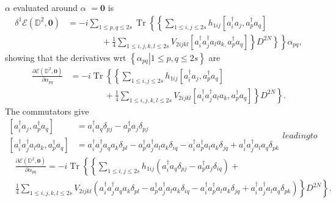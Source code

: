 \documentclass[aps,preprint]{revtex4}%
\begin{document}
\textbf{$\alpha$} evaluated around \textbf{$\alpha$ }$=\mathbf{0}$ is
\begin{align}
\delta^{1}\mathcal{E}\left(  \mathbb{D}^{2},\mathbf{0}\right)   &
=-i\sum_{1\leq p,q\leq2s}\operatorname{Tr}\left\{  \left\{  \sum_{1\leq
i,j\leq2s}h_{1ij}\left[  a_{i}^{\dagger}a_{j},a_{p}^{\dagger}a_{q}\right]
\right.  \right. \nonumber\\
&  \qquad\qquad+\left.  \left.  \frac{1}{4}\sum_{1\leq i,j,k,l\leq2s}%
V_{2ijkl}\left[  a_{i}^{\dagger}a_{j}^{\dagger}a_{l}a_{k,}a_{p}^{\dagger}%
a_{q}\right]  \right\}  \left.  D^{2N}\right\}  \right\}  \alpha_{pq},
\end{align}
showing that the derivatives wrt $\left\{  \left.  \alpha_{pq}\right\vert
1\leq p,q\leq2s\right\}  $ are
\begin{align}
\frac{\partial\mathcal{E}\left(  \mathbb{D}^{2},\mathbf{0}\right)  }%
{\partial\alpha_{pq}}  &  =-i\operatorname{Tr}\left\{  \left\{  \sum_{1\leq
i,j\leq2s}h_{1ij}\left[  a_{i}^{\dagger}a_{j},a_{p}^{\dagger}a_{q}\right]
\right.  \right. \nonumber\\
&  \qquad\qquad+\left.  \left.  \frac{1}{4}\sum_{1\leq i,j,k,l\leq2s}%
V_{2ijkl}\left[  a_{i}^{\dagger}a_{j}^{\dagger}a_{l}a_{k},a_{p}^{\dagger}%
a_{q}\right]  \right\}  D^{2N}\right\}  .
\end{align}
The commutators give
\begin{subequations}
\begin{align}
\left[  a_{i}^{\dagger}a_{j},a_{p}^{\dagger}a_{q}\right]   &  =a_{i}^{\dagger
}a_{q}\delta_{pj}-a_{p}^{\dagger}a_{j}\delta_{pj}\\
\left[  a_{i}^{\dagger}a_{j}^{\dagger}a_{l}a_{k},a_{p}^{\dagger}a_{q}\right]
&  =a_{i}^{\dagger}a_{j}^{\dagger}a_{q}a_{k}\delta_{pl}-a_{p}^{\dagger}%
a_{j}^{\dagger}a_{l}a_{k}\delta_{iq}-a_{i}^{\dagger}a_{p}^{\dagger}a_{l}%
a_{k}\delta_{jq}+a_{i}^{\dagger}a_{j}^{\dagger}a_{l}a_{q}\delta_{pk}%
\end{align}
leading to
\end{subequations}
\begin{align}
&  \frac{\partial\mathcal{E}\left(  \mathbb{D}^{2},\mathbf{0}\right)
}{\partial\alpha_{pq}}=-i\operatorname{Tr}\left\{  \left\{  \sum_{1\leq
i,j\leq2s}h_{1ij}\left(  a_{i}^{\dagger}a_{q}\delta_{pj}-a_{p}^{\dagger}%
a_{j}\delta_{iq}\right)  \right.  \right.  +\nonumber\\
&  \left.  \left.  \frac{1}{4}\sum_{1\leq i,j,k,l\leq2s}V_{2ijkl}\left(
a_{i}^{\dagger}a_{j}^{\dagger}a_{q}a_{k}\delta_{pl}-a_{p}^{\dagger}%
a_{j}^{\dagger}a_{l}a_{k}\delta_{iq}-a_{i}^{\dagger}a_{p}^{\dagger}a_{l}%
a_{k}\delta_{jq}+a_{i}^{\dagger}a_{j}^{\dagger}a_{l}a_{q}\delta_{pk}\right)
\right\}  D^{2N}\right\}  .
\end{align}
\end{document}
